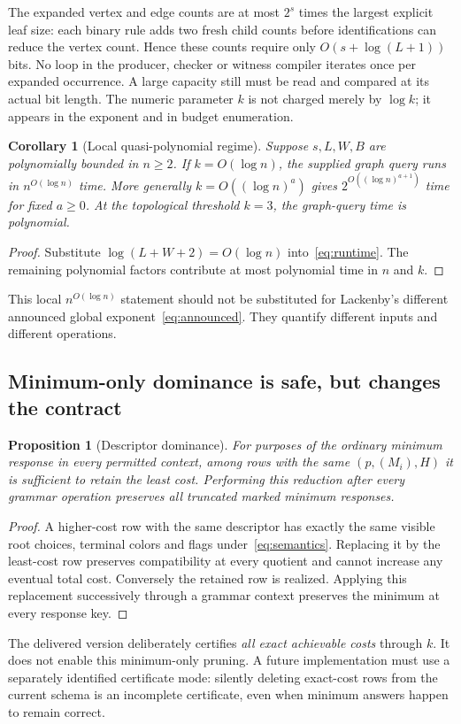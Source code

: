 \documentclass[11pt,letterpaper]{article}
\newtheorem{proposition}[theorem]{Proposition}
\newtheorem{corollary}[theorem]{Corollary}
\theoremstyle{definition}
\theoremstyle{remark}\newtheorem{remark}[theorem]{Remark}
\begin{document}
The expanded vertex and edge counts are at most $2^s$ times the largest explicit leaf size: each binary rule adds two fresh child counts before identifications can reduce the vertex count. Hence these counts require only $O(s+\log(L+1))$ bits. No loop in the producer, checker or witness compiler iterates once per expanded occurrence. A large capacity still must be read and compared at its actual bit length. The numeric parameter $k$ is not charged merely by $\log k$; it appears in the exponent and in budget enumeration.

\begin{corollary}[Local quasi-polynomial regime]\label{cor:qp}
Suppose $s,L,W,B$ are polynomially bounded in $n\ge2$. If $k=O(\log n)$, the supplied graph query runs in $n^{O(\log n)}$ time. More generally $k=O((\log n)^a)$ gives $2^{O((\log n)^{a+1})}$ time for fixed $a\ge0$. At the topological threshold $k=3$, the graph-query time is polynomial.
\end{corollary}
\begin{proof}
Substitute $\log(L+W+2)=O(\log n)$ into~\eqref{eq:runtime}. The remaining polynomial factors contribute at most polynomial time in $n$ and $k$.
\end{proof}
This local $n^{O(\log n)}$ statement should not be substituted for Lackenby's different announced global exponent~\eqref{eq:announced}. They quantify different inputs and different operations.

\subsection{Minimum-only dominance is safe, but changes the contract}
\begin{proposition}[Descriptor dominance]\label{prop:dominance}
For purposes of the ordinary minimum response in every permitted context, among rows with the same $(p,(M_i),H)$ it is sufficient to retain the least cost. Performing this reduction after every grammar operation preserves all truncated marked minimum responses.
\end{proposition}
\begin{proof}
A higher-cost row with the same descriptor has exactly the same visible root choices, terminal colors and flags under~\eqref{eq:semantics}. Replacing it by the least-cost row preserves compatibility at every quotient and cannot increase any eventual total cost. Conversely the retained row is realized. Applying this replacement successively through a grammar context preserves the minimum at every response key.
\end{proof}
The delivered version deliberately certifies \emph{all exact achievable costs} through $k$. It does not enable this minimum-only pruning. A future implementation must use a separately identified certificate mode: silently deleting exact-cost rows from the current schema is an incomplete certificate, even when minimum answers happen to remain correct.
\end{document}
